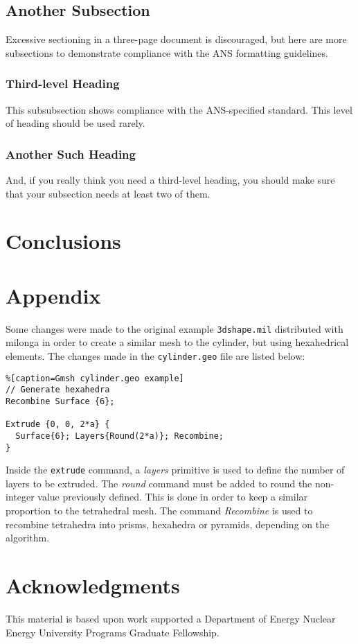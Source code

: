\documentclass{anstrans}
\begin{document}
\subsection{Another Subsection}
Excessive sectioning in a three-page document is discouraged, but here are more
subsections to demonstrate compliance with the ANS formatting guidelines.

\subsubsection{Third-level Heading}
This subsubsection shows compliance with the ANS-specified standard. This level
of heading should be used rarely.

\subsubsection{Another Such Heading}
And, if you really think you need a third-level heading, you should make sure
that your subsection needs at least two of them.

\section{Conclusions}

\appendix
\section{Appendix}
\label{Appendix}
Some changes were made to the original example \texttt{3dshape.mil} distributed
with milonga in order to create a similar mesh to the cylinder, but using
hexahedrical elements. The changes made in the \texttt{cylinder.geo} file
are listed below:

\begin{lstlisting}%[caption=Gmsh cylinder.geo example]
// Generate hexahedra
Recombine Surface {6};

Extrude {0, 0, 2*a} {
  Surface{6}; Layers{Round(2*a)}; Recombine;
}
\end{lstlisting}

Inside the \texttt{extrude} command, a \textit{layers} primitive is used to
define the number of layers to be extruded. The \textit{round} command must
be added to round the non-integer value previously defined. This is done
in order to keep a similar proportion to the tetrahedral mesh. The
command \textit{Recombine} is used to recombine tetrahedra into prisms,
hexahedra or pyramids, depending on the algorithm.

\section{Acknowledgments}
This material is based upon work supported a Department of Energy Nuclear
Energy University Programs Graduate Fellowship.


\end{document}
